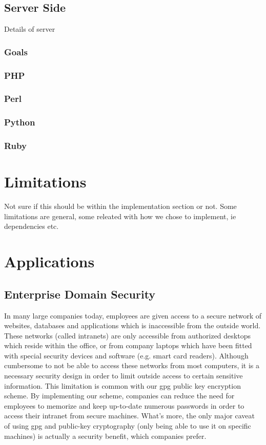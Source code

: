 \documentclass[11pt]{article}
\begin{document}
\subsection{Server Side}
Details of server
\subsubsection{Goals}
\subsubsection{PHP}
\subsubsection{Perl}
\subsubsection{Python}
\subsubsection{Ruby}

\section{Limitations} \label{sec:limitations}
Not sure if this should be within the implementation section or not. Some limitations are general, some releated with how we chose to implement, ie dependencies etc.

\section{Applications} \label{sec:applications}
\subsection{Enterprise Domain Security} \label{subsec:enterprisedomainsecurity}
In many large companies today, employees are given access to a secure network of websites, databases and applications which is inaccessible from the outside world.  These networks (called intranets) are only accessible from authorized desktops which reside within the office, or from company laptops which have been fitted with special security devices and software (e.g. smart card readers).  Although cumbersome to not be able to access these networks from most computers, it is a necessary security design in order to limit outside access to certain sensitive information.  This limitation is common with our gpg public key encryption scheme.  By implementing our scheme, companies can reduce the need for employees to memorize and keep up-to-date numerous passwords in order to access their intranet from secure machines.  What's more, the only major caveat of using gpg and public-key cryptography (only being able to use it on specific machines) is actually a security benefit, which companies prefer.
\end{document}

